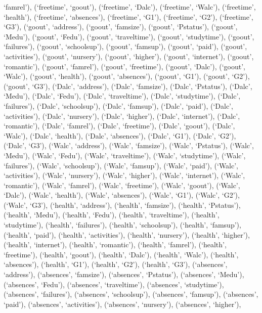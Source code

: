 \documentclass[
]{article}
\begin{document}
`famrel'), (`freetime', `goout'), (`freetime', `Dalc'), (`freetime',
`Walc'), (`freetime', `health'), (`freetime', `absences'), (`freetime',
`G1'), (`freetime', `G2'), (`freetime', `G3'), (`goout', `address'),
(`goout', `famsize'), (`goout', `Pstatus'), (`goout', `Medu'), (`goout',
`Fedu'), (`goout', `traveltime'), (`goout', `studytime'), (`goout',
`failures'), (`goout', `schoolsup'), (`goout', `famsup'), (`goout',
`paid'), (`goout', `activities'), (`goout', `nursery'), (`goout',
`higher'), (`goout', `internet'), (`goout', `romantic'), (`goout',
`famrel'), (`goout', `freetime'), (`goout', `Dalc'), (`goout', `Walc'),
(`goout', `health'), (`goout', `absences'), (`goout', `G1'), (`goout',
`G2'), (`goout', `G3'), (`Dalc', `address'), (`Dalc', `famsize'),
(`Dalc', `Pstatus'), (`Dalc', `Medu'), (`Dalc', `Fedu'), (`Dalc',
`traveltime'), (`Dalc', `studytime'), (`Dalc', `failures'), (`Dalc',
`schoolsup'), (`Dalc', `famsup'), (`Dalc', `paid'), (`Dalc',
`activities'), (`Dalc', `nursery'), (`Dalc', `higher'), (`Dalc',
`internet'), (`Dalc', `romantic'), (`Dalc', `famrel'), (`Dalc',
`freetime'), (`Dalc', `goout'), (`Dalc', `Walc'), (`Dalc', `health'),
(`Dalc', `absences'), (`Dalc', `G1'), (`Dalc', `G2'), (`Dalc', `G3'),
(`Walc', `address'), (`Walc', `famsize'), (`Walc', `Pstatus'), (`Walc',
`Medu'), (`Walc', `Fedu'), (`Walc', `traveltime'), (`Walc',
`studytime'), (`Walc', `failures'), (`Walc', `schoolsup'), (`Walc',
`famsup'), (`Walc', `paid'), (`Walc', `activities'), (`Walc',
`nursery'), (`Walc', `higher'), (`Walc', `internet'), (`Walc',
`romantic'), (`Walc', `famrel'), (`Walc', `freetime'), (`Walc',
`goout'), (`Walc', `Dalc'), (`Walc', `health'), (`Walc', `absences'),
(`Walc', `G1'), (`Walc', `G2'), (`Walc', `G3'), (`health', `address'),
(`health', `famsize'), (`health', `Pstatus'), (`health', `Medu'),
(`health', `Fedu'), (`health', `traveltime'), (`health', `studytime'),
(`health', `failures'), (`health', `schoolsup'), (`health', `famsup'),
(`health', `paid'), (`health', `activities'), (`health', `nursery'),
(`health', `higher'), (`health', `internet'), (`health', `romantic'),
(`health', `famrel'), (`health', `freetime'), (`health', `goout'),
(`health', `Dalc'), (`health', `Walc'), (`health', `absences'),
(`health', `G1'), (`health', `G2'), (`health', `G3'), (`absences',
`address'), (`absences', `famsize'), (`absences', `Pstatus'),
(`absences', `Medu'), (`absences', `Fedu'), (`absences', `traveltime'),
(`absences', `studytime'), (`absences', `failures'), (`absences',
`schoolsup'), (`absences', `famsup'), (`absences', `paid'), (`absences',
`activities'), (`absences', `nursery'), (`absences', `higher'),
\end{document}
